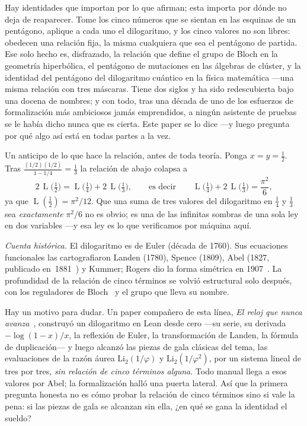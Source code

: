 \documentclass[11pt]{article}
\newcommand{\Li}{\mathrm{Li}_2}
\DeclareMathOperator{\Lrog}{L}
\begin{document}
Hay identidades que importan por lo que afirman; esta importa por d\'onde no deja de
reaparecer. Tome los cinco n\'umeros que se sientan en las esquinas de un pent\'agono,
aplique a cada uno el dilogaritmo, y los cinco valores no son libres: obedecen una relaci\'on
fija, la misma cualquiera que sea el pent\'agono de partida. Ese solo hecho es, disfrazado,
la relaci\'on que define el grupo de Bloch en la geometr\'ia hiperb\'olica, el pent\'agono de
mutaciones en las \'algebras de cl\'uster, y la identidad del pent\'agono del dilogaritmo
cu\'antico en la f\'isica matem\'atica ---una misma relaci\'on con tres m\'ascaras. Tiene dos
siglos y ha sido redescubierta bajo una docena de nombres; y con todo, tras una d\'ecada de
uno de los esfuerzos de formalizaci\'on m\'as ambiciosos jam\'as emprendidos, a ning\'un
asistente de pruebas se le hab\'ia dicho nunca que es cierta. Este paper se lo dice ---y
luego pregunta por qu\'e algo as\'i est\'a en todas partes a la vez.

Un anticipo de lo que hace la relaci\'on, antes de toda teor\'ia. Ponga $x=y=\tfrac12$. Tras
$\tfrac{(1/2)(1/2)}{1-1/4}=\tfrac13$ la relaci\'on de abajo colapsa a
\[
  2\,\Lrog\!\big(\tfrac12\big)=\Lrog\!\big(\tfrac14\big)+2\,\Lrog\!\big(\tfrac13\big),
  \qquad\text{es decir}\qquad \Lrog\!\big(\tfrac14\big)+2\,\Lrog\!\big(\tfrac13\big)
  =\frac{\pi^2}{6},
\]
ya que $\Lrog(\tfrac12)=\pi^2/12$. Que una suma de tres valores del dilogaritmo en $\tfrac14$
y $\tfrac13$ sea \emph{exactamente} $\pi^2/6$ no es obvio; es una de las infinitas sombras de
una sola ley en dos variables ---y esa ley es lo que verificamos por m\'aquina aqu\'i.

\emph{Cuenta hist\'orica.} El dilogaritmo es de Euler (d\'ecada de 1760). Sus ecuaciones
funcionales las cartografiaron Landen (1780), Spence (1809), Abel (1827, publicado
en~1881~\cite{abel}) y Kummer; Rogers dio la forma sim\'etrica en 1907~\cite{rogers}. La
profundidad de la relaci\'on de cinco t\'erminos se volvi\'o estructural solo despu\'es, con
los reguladores de Bloch~\cite{bloch} y el grupo que lleva su nombre.

Hay un motivo para dudar. Un paper compa\~nero de esta l\'inea, \emph{El reloj que nunca
avanza}~\cite{clock}, construy\'o un dilogaritmo en Lean desde cero ---su serie, su derivada
$-\log(1-x)/x$, la reflexi\'on de Euler, la transformaci\'on de Landen, la f\'ormula de
duplicaci\'on--- y luego alcanz\'o las piezas de gala cl\'asicas del tema, las evaluaciones
de la raz\'on \'aurea $\Li(1/\varphi)$ y $\Li(1/\varphi^2)$, por un sistema lineal de tres
por tres, \emph{sin relaci\'on de cinco t\'erminos alguna}. Todo manual llega a esos valores
por Abel; la formalizaci\'on hall\'o una puerta lateral. As\'i que la primera pregunta
honesta no es c\'omo probar la relaci\'on de cinco t\'erminos sino si vale la pena: si las
piezas de gala se alcanzan sin ella, ¿en qu\'e se gana la identidad el sueldo?
\end{document}

